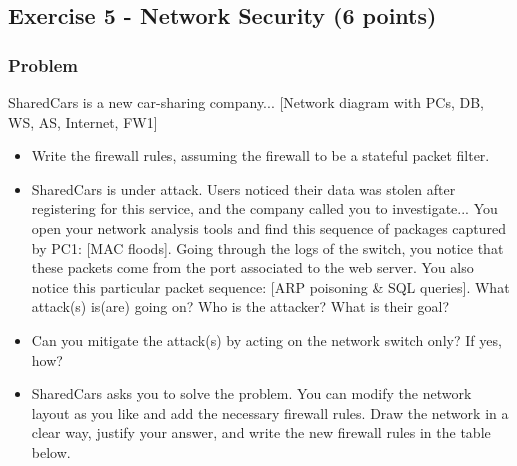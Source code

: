 \documentclass{article}
\begin{document}
\subsection{Exercise 5 - Network Security (6 points)}
\subsubsection*{Problem}
SharedCars is a new car-sharing company... [Network diagram with PCs, DB, WS, AS, Internet, FW1]
\begin{itemize}
    \item[\textbf{1.}] [1 points] Write the firewall rules, assuming the firewall to be a stateful packet filter.
    \item[\textbf{2.}] [2 points] SharedCars is under attack. Users noticed their data was stolen after registering for this service, and the company called you to investigate... You open your network analysis tools and find this sequence of packages captured by PC1: [MAC floods]. Going through the logs of the switch, you notice that these packets come from the port associated to the web server. You also notice this particular packet sequence: [ARP poisoning \& SQL queries]. What attack(s) is(are) going on? Who is the attacker? What is their goal?
    \item[\textbf{3.}] [1 point] Can you mitigate the attack(s) by acting on the network switch only? If yes, how?
    \item[\textbf{4.}] [2 points] SharedCars asks you to solve the problem. You can modify the network layout as you like and add the necessary firewall rules. Draw the network in a clear way, justify your answer, and write the new firewall rules in the table below.
\end{itemize}
\end{document}
